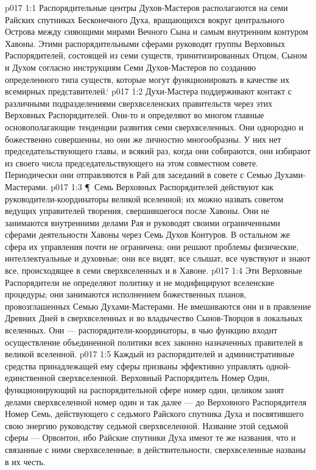 \vs p017 1:1 Распорядительные центры Духов\hyp{}Мастеров располагаются на семи Райских спутниках Бесконечного Духа, вращающихся вокруг центрального Острова между сияющими мирами Вечного Сына и самым внутренним контуром Хавоны. Этими распорядительными сферами руководят группы Верховных Распорядителей, состоящей из семи существ, тринитизированных Отцом, Сыном и Духом согласно инструкциям Семи Духов\hyp{}Мастеров по созданию определенного типа существ, которые могут функционировать в качестве их всемирных представителей.`
\vs p017 1:2 Духи\hyp{}Мастера поддерживают контакт с различными подразделениями сверхвселенских правительств через этих Верховных Распорядителей. Они\hyp{}то и определяют во многом главные основополагающие тенденции развития семи сверхвселенных. Они однородно и божественно совершенны, но они же личностно многообразны. У них нет председательствующего главы, и всякий раз, когда они собираются, они избирают из своего числа председательствующего на этом совместном совете. Периодически они отправляются в Рай для заседаний в совете с Семью Духами\hyp{}Мастерами.
\vs p017 1:3 \P\ Семь Верховных Распорядителей действуют как руководители\hyp{}координаторы великой вселенной; их можно назвать советом ведущих управителей творения, свершившегося после Хавоны. Они не занимаются внутренними делами Рая и руководят своими ограниченными сферами деятельности Хавоны через Семь Духов Контуров. В остальном же сфера их управления почти не ограничена; они решают проблемы физические, интеллектуальные и духовные; они все видят, все слышат, все чувствуют и знают все, происходящее в семи сверхвселенных и в Хавоне.
\vs p017 1:4 Эти Верховные Распорядители не определяют политику и не модифицируют вселенские процедуры; они занимаются исполнением божественных планов, провозглашенных Семью Духами\hyp{}Мастерами. Не вмешиваются они и в правление Древних Дней в сверхвселенных и во владычество Сынов\hyp{}Творцов в локальных вселенных. Они --- распорядители\hyp{}координаторы, в чью функцию входит осуществление объединенной политики всех законно назначенных правителей в великой вселенной.
\vs p017 1:5 Каждый из распорядителей и административные средства принадлежащей ему сферы призваны эффективно управлять одной\hyp{}единственной сверхвселенной. Верховный Распорядитель Номер Один, функционирующий на распорядительной сфере номер один, целиком занят делами сверхвселенной номер один и так далее --- до Верховного Распорядителя Номер Семь, действующего с седьмого Райского спутника Духа и посвятившего свою энергию руководству седьмой сверхвселенной. Название этой седьмой сферы --- Орвонтон, ибо Райские спутники Духа имеют те же названия, что и связанные с ними сверхвселенные; в действительности, сверхвселенные названы в их честь.
